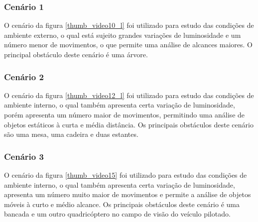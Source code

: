 \subsubsection{Cenário 1}

O cenário da figura \ref{thumb_video10_l} foi utilizado para estudo das condições de ambiente externo, o qual está sujeito grandes variações de luminosidade e um número menor de movimentos, o que permite uma análise de alcances maiores. O principal  obstáculo deste cenário é uma árvore. 


\subsubsection{Cenário 2}

O cenário da figura \ref{thumb_video12_l} foi utilizado para estudo das condições de ambiente interno, o qual também apresenta certa variação de luminosidade, porém apresenta um número maior de movimentos, permitindo uma análise de objetos estáticos à curta e média distância. Os principais obstáculos deste cenário são uma mesa, uma cadeira e duas estantes.


\subsubsection{Cenário 3}

O cenário da figura \ref{thumb_video15} foi utilizado para estudo das condições de ambiente interno, o qual também apresenta certa variação de luminosidade, apresenta um número muito maior de movimentos e permite a análise de objetos móveis à curto e médio alcance. Os principais obstáculos deste cenário  é uma bancada e um outro quadricóptero no campo de visão do veículo pilotado.


